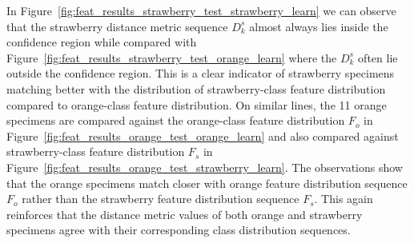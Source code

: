 \documentclass {udthesis}
\begin{document}
In Figure~\ref{fig:feat_results_strawberry_test_strawberry_learn} we can observe that the strawberry distance metric sequence $D^s_k$ almost always lies inside the confidence region while compared with Figure~\ref{fig:feat_results_strawberry_test_orange_learn} where the $D^s_k$ often lie outside the confidence region. This is a clear indicator of strawberry specimens matching better with the distribution of strawberry-class feature distribution compared to orange-class feature distribution. On similar lines, the 11 orange specimens are compared against the orange-class feature distribution $F_{o}$ in Figure~\ref{fig:feat_results_orange_test_orange_learn} and also compared against strawberry-class feature distribution $F_{s}$ in Figure~\ref{fig:feat_results_orange_test_strawberry_learn}. The observations show that the orange specimens match closer with orange feature distribution sequence $F_{o}$ rather than the strawberry feature distribution sequence $F_{s}$. This again reinforces that the distance metric 
values of both orange and strawberry specimens agree with their corresponding class distribution sequences.
\end{document}
